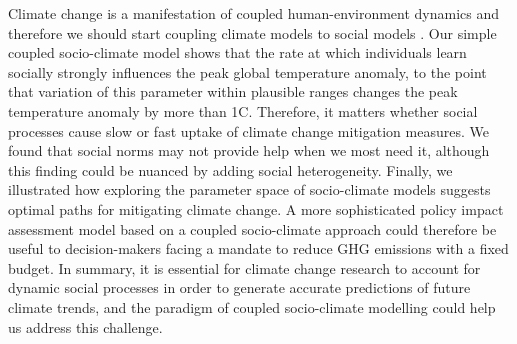 \documentclass[10pt,letterpaper]{article}
\newlength\savedwidth
\newcommand\thickhline{\noalign{\global\savedwidth\arrayrulewidth\global\arrayrulewidth 2pt}%
\hline
\noalign{\global\arrayrulewidth\savedwidth}}
\begin{document}
Climate change is a manifestation of coupled human-environment dynamics and therefore we should start coupling climate models to social models \cite{castree14,turner03}. Our simple coupled socio-climate model shows that the rate at which individuals learn socially strongly influences the peak global temperature anomaly, to the point that variation of this parameter within plausible ranges changes the peak temperature anomaly by more than 1\degree C. Therefore, it matters whether social processes cause slow or fast uptake of climate change mitigation measures. We found that social norms may not provide help when we most need it, although this finding could be nuanced by adding social heterogeneity. Finally, we illustrated how exploring the parameter space of socio-climate models suggests optimal paths for mitigating climate change. A more sophisticated policy impact assessment model based on a coupled socio-climate approach could therefore be useful to decision-makers facing a mandate to reduce GHG emissions with a fixed budget. In summary, it is essential for climate change research to account for dynamic social processes in order to generate accurate predictions of future climate trends, and the paradigm of coupled socio-climate modelling could help us address this challenge.







\end{document}
